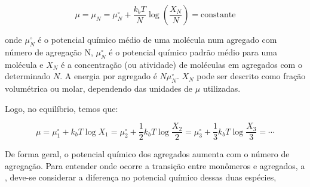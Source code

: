 		\begin{equation}
			\mu = \mu_N = \mu_N^\circ + \dfrac{k_b T}{N} \log \left( \dfrac{X_N}{N} \right) = \mathrm{constante}
			\label{eqn:potencial_quimico_micelas}
		\end{equation} 
		
		\noindent onde \(\mu_N^\circ\) é o potencial químico médio de uma molécula num agregado com número de agregação N, \(\mu_N^\circ\) é o potencial químico padrão médio para uma molécula e \(X_N\) é a concentração (ou atividade) de moléculas em agregados com o determinado \(N\). A energia por agregado é \(N\mu_N^\circ\). \(X_N\) pode ser descrito como fração volumétrica ou molar, dependendo das unidades de \(\mu\) utilizadas.
		
		Logo, no equilíbrio, temos que:
		
		\begin{equation}
			\mu = \mu_1^\circ + k_b T \log X_1 = \mu_2^\circ + \dfrac{1}{2} k_b T \log \dfrac{X_2}{2} = \mu_3^\circ + \dfrac{1}{3} k_b T \log \dfrac{X_3}{3} = \cdots
		\end{equation}
		
%		
%		
%		
%		
	

		De forma geral, o potencial químico dos agregados aumenta com o número de agregação. Para entender onde ocorre a transição entre monômeros e agregados, a \cmc, deve-se considerar a diferença no potencial químico dessas duas espécies,
		
